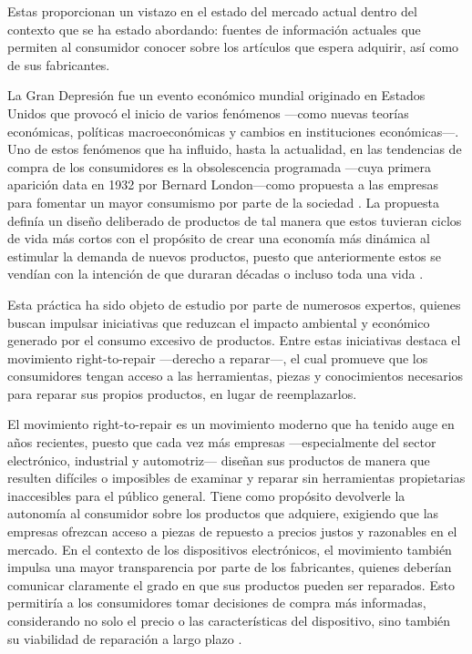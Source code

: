 Estas proporcionan un vistazo en el estado del mercado actual dentro del
contexto que se ha estado abordando: fuentes de información actuales que
permiten al consumidor conocer sobre los artículos que espera adquirir, así como
de sus fabricantes. 

La Gran Depresión fue un evento económico mundial originado en Estados Unidos
que provocó el inicio de varios fenómenos —como nuevas teorías económicas,
políticas macroeconómicas y cambios en instituciones económicas—. Uno de estos
fenómenos que ha influido, hasta la actualidad, en las tendencias de compra de
los consumidores es la obsolescencia programada —cuya primera aparición data en
1932 por Bernard London—como propuesta a las empresas para fomentar un mayor
consumismo por parte de la sociedad \parencite[p.~3]{corrocher2025}. La
propuesta definía un diseño deliberado de productos de tal manera que estos
tuvieran ciclos de vida más cortos con el propósito de crear una economía más
dinámica al estimular la demanda de nuevos productos, puesto que anteriormente
estos se vendían con la intención de que duraran décadas o incluso toda una vida
\parencite[p.~723]{malinauskaite2021}.

Esta práctica ha sido objeto de estudio por parte de numerosos expertos, quienes
buscan impulsar iniciativas que reduzcan el impacto ambiental y económico
generado por el consumo excesivo de productos. Entre estas iniciativas destaca el
movimiento right-to-repair —derecho a reparar—, el cual promueve que los
consumidores tengan acceso a las herramientas, piezas y conocimientos necesarios
para reparar sus propios productos, en lugar de reemplazarlos.

El movimiento right-to-repair es un movimiento moderno que ha tenido auge en
años recientes, puesto que cada vez más empresas —especialmente del sector
electrónico, industrial y automotriz— diseñan sus productos de manera que
resulten difíciles o imposibles de examinar y reparar sin herramientas
propietarias inaccesibles para el público general. Tiene como propósito
devolverle la autonomía al consumidor sobre los productos que adquiere,
exigiendo que las empresas ofrezcan acceso a piezas de repuesto a precios justos
y razonables en el mercado. En el contexto de los dispositivos electrónicos, el
movimiento también impulsa una mayor transparencia por parte de los fabricantes,
quienes deberían comunicar claramente el grado en que sus productos pueden ser
reparados. Esto permitiría a los consumidores tomar decisiones de compra más
informadas, considerando no solo el precio o las características del
dispositivo, sino también su viabilidad de reparación a largo plazo
\parencite{biscontini2024}.

